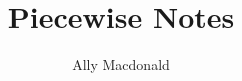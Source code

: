 \documentclass[10pt,a4paper]{book}
\begin{document}
\title{Piecewise Notes}
\author{Ally Macdonald}
\date{}

\maketitle
\newpage

\tableofcontents
\end{document}
